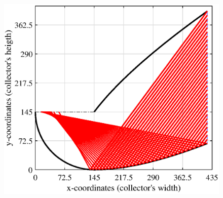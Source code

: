 \begin{figure}[ht!]
	\begin{minipage}{0.48\columnwidth}
		\includegraphics[scale=0.45]{figs/RT2D-hts0.eps}
		

\end{minipage}
\end{figure}
